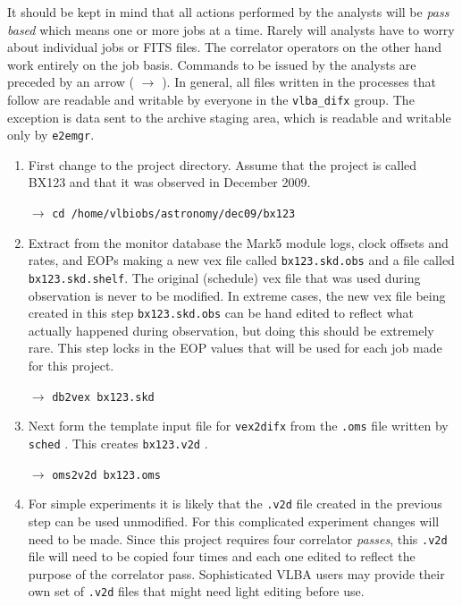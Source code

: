 It should be kept in mind that all actions performed by the analysts will be {\em pass based} which means one or more jobs at a time.
Rarely will analysts have to worry about individual jobs or FITS files.
The correlator operators on the other hand work entirely on the job basis.
Commands to be issued by the analysts are preceded by an arrow ( $\longrightarrow$ ).
In general, all files written in the processes that follow are readable and writable by everyone in the {\tt vlba\_difx} group.
The exception is data sent to the archive staging area, which is readable and writable only by {\tt e2emgr}.

\begin{enumerate}

\item
First change to the project directory.
Assume that the project is called BX123 and that it was observed in December 2009.

$\longrightarrow$ {\tt cd /home/vlbiobs/astronomy/dec09/bx123}

\item
Extract from the monitor database the Mark5 module logs, clock offsets and rates, and EOPs making a new vex file called {\tt bx123.skd.obs} and a file called {\tt bx123.skd.shelf}.
The original (schedule) vex file that was used during observation is never to be modified.  
In extreme cases, the new vex file being created in this step {\tt bx123.skd.obs} can be hand edited to reflect what actually happened during observation, but doing this should be extremely rare. 
This step locks in the EOP values that will be used for each job made for this project.

$\longrightarrow$ {\tt db2vex bx123.skd}

\item
Next form the template input file for {\tt vex2difx} from the {\tt .oms} file written by {\tt sched} .
This creates {\tt bx123.v2d} .

$\longrightarrow$ {\tt oms2v2d bx123.oms}

\item
For simple experiments it is likely that the {\tt .v2d} file  created in the previous step can be used unmodified.
For this complicated experiment changes will need to be made.
Since this project requires four correlator {\em passes}, this {\tt .v2d} file will need to be copied four times and each one edited to reflect the purpose of the correlator pass.
Sophisticated VLBA users may provide their own set of {\tt .v2d} files that might need light editing before use.


\end{enumerate}
